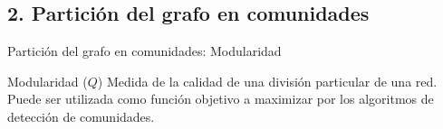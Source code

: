   
  \subsection{2. Partición del grafo en comunidades}
  
  \begin{frame}{Partición del grafo en comunidades: Modularidad}
    \begin{overlayarea}{\linewidth}{1\textheight}
      \begin{alertblock}{Modularidad ($Q$)}
        \vskip0.5mm
        Medida de la calidad de una división particular de una red.
        Puede ser utilizada como función objetivo a maximizar por
        los algoritmos de detección de comunidades.
      \end{alertblock}
  
  

\end{overlayarea}
\end{frame}
